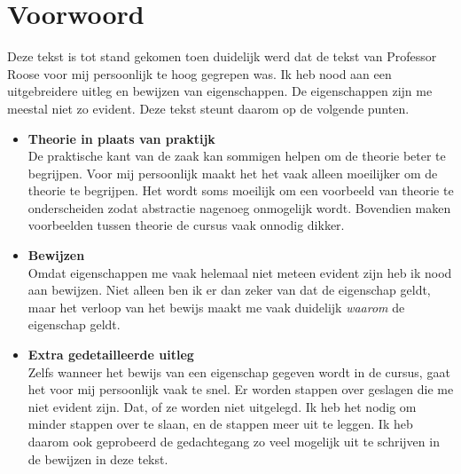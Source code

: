\documentclass[computergesteund_ontwerp_van_curven_en_oppervlakken.tex]{subfiles}
\begin{document}
\section*{Voorwoord}
Deze tekst is tot stand gekomen toen duidelijk werd dat de tekst van Professor Roose \cite{tmi} voor mij persoonlijk te hoog gegrepen was. Ik heb nood aan een uitgebreidere uitleg en bewijzen van eigenschappen. De eigenschappen zijn me meestal niet zo evident. Deze tekst steunt daarom op de volgende punten.
\begin{itemize}
\item \textbf{Theorie in plaats van praktijk}\\
De praktische kant van de zaak kan sommigen helpen om de theorie beter te begrijpen. Voor mij persoonlijk maakt het het vaak alleen moeilijker om de theorie te begrijpen. Het wordt soms moeilijk om een voorbeeld van theorie te onderscheiden zodat abstractie nagenoeg onmogelijk wordt. Bovendien maken voorbeelden tussen theorie de cursus vaak onnodig dikker.

\item \textbf{Bewijzen}\\
Omdat eigenschappen me vaak helemaal niet meteen evident zijn heb ik nood aan bewijzen. Niet alleen ben ik er dan zeker van dat de eigenschap geldt, maar het verloop van het bewijs maakt me vaak duidelijk \emph{waarom} de eigenschap geldt.

\item \textbf{Extra gedetailleerde uitleg}\\
Zelfs wanneer het bewijs van een eigenschap gegeven wordt in de cursus, gaat het voor mij persoonlijk vaak te snel. Er worden stappen over geslagen die me niet evident zijn. Dat, of ze worden niet uitgelegd. Ik heb het nodig om minder stappen over te slaan, en de stappen meer uit te leggen. Ik heb daarom ook geprobeerd de gedachtegang zo veel mogelijk uit te schrijven in de bewijzen in deze tekst.

\end{itemize}
\end{document}
